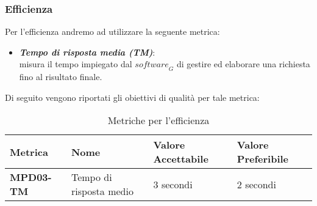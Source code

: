 \subsubsection{Efficienza}
Per l'efficienza andremo ad utilizzare la seguente metrica:
\begin{itemize}
    \item \textbf{\emph{Tempo di risposta media (TM)}}:\\
    misura il tempo impiegato dal $\textit{software}_G$ di gestire ed elaborare una richiesta fino al risultato finale.
\end{itemize}
Di seguito vengono riportati gli obiettivi di qualità per tale metrica:
\begin{table}[htbp]
    \centering
    \begin{tabular}{|>{\centering\arraybackslash}p{4cm}|p{4cm}|p{4cm}|p{4cm}|}
    \hline
    \rowcolor{gray!30}
    \textbf{Metrica} & \textbf{Nome} & \textbf{Valore Accettabile} & \textbf{Valore Preferibile} \\
    \hline
    \rowcolor{gray!10}
    \textbf{MPD03-TM} & Tempo di risposta medio & 3 secondi & 2 secondi \\
    \hline
    \end{tabular}
    \caption{Metriche per l'efficienza}
    \label{tab:metriche_efficienza}
\end{table}

